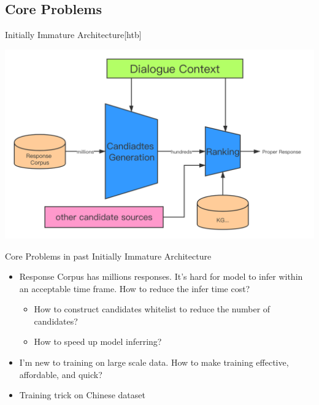 \documentclass{beamer}
\begin{document}
\subsection{Core Problems}
\begin{frame}{Initially Immature Architecture}[htb]
     \begin{center}
        \includegraphics[width=1\linewidth]{arch.png}
    \end{center}
\end{frame}

\begin{frame} {Core Problems in past Initially Immature Architecture}

        \begin{itemize}
            \item Response Corpus has millions responses. It's hard for model to infer within an acceptable time frame. How to reduce the infer time cost?
            \begin{itemize}
                \item How to construct candidates whitelist to reduce the number of candidates?
                \item How to speed up model inferring?
            \end{itemize}
            \item I'm new to training on large scale data. How to make training effective, affordable, and quick?
            \item Training trick on Chinese dataset
        \end{itemize}
        
\end{frame}

\end{document}
